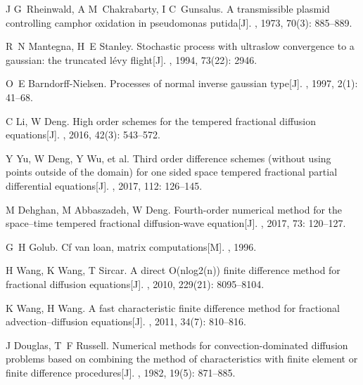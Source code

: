 \documentclass[twoside,UTF8]{nputhesis}
\begin{document}
\begin{thebibliography}{99}
	J G~Rheinwald, A M~Chakrabarty, I C~Gunsalus.
	\newblock A transmissible plasmid controlling camphor oxidation in pseudomonas
	putida[J].
	, 1973, 70(3): 885--889.
	
	R~N Mantegna, H~E Stanley.
	\newblock Stochastic process with ultraslow convergence to a gaussian: the
	truncated l{\'e}vy flight[J].
	, 1994, 73(22): 2946.
	
	O~E Barndorff-Nielsen.
	\newblock Processes of normal inverse gaussian type[J].
	, 1997, 2(1): 41--68.
	
	C Li, W Deng.
	\newblock High order schemes for the tempered fractional diffusion equations[J].
	, 2016, 42(3): 543--572.
	
	Y Yu, W Deng, Y Wu, et al.
	\newblock Third order difference schemes (without using points outside of the
	domain) for one sided space tempered fractional partial differential
	equations[J].
	, 2017, 112: 126--145.
	
	M Dehghan, M Abbaszadeh, W Deng.
	\newblock Fourth-order numerical method for the space--time tempered fractional
	diffusion-wave equation[J].
	, 2017, 73: 120--127.
	
	G~H Golub.
	\newblock Cf van loan, matrix computations[M].
	, 1996.
	
	H Wang, K Wang, T Sircar.
	\newblock A direct O(nlog2(n)) finite difference method for fractional
	diffusion equations[J].
	, 2010, 229(21): 8095--8104.
	
	K Wang, H Wang.
	\newblock A fast characteristic finite difference method for fractional
	advection--diffusion equations[J].
	, 2011, 34(7): 810--816.
	
	J Douglas, T~F Russell.
	\newblock Numerical methods for convection-dominated diffusion problems based
	on combining the method of characteristics with finite element or finite
	difference procedures[J].
	, 1982, 19(5): 871--885.
	

\end{thebibliography}
\end{document}
